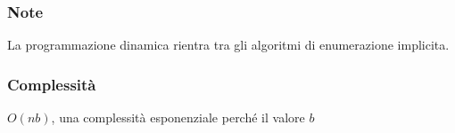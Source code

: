 \documentclass[../template]{subfiles}
\begin{document}
\subsubsection{Note}
La programmazione dinamica rientra tra gli algoritmi di enumerazione implicita.
\subsubsection{Complessità}
$O(nb)$, una complessità esponenziale perché il valore $b$
%
%
\end{document}
